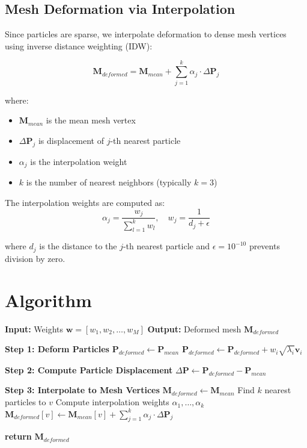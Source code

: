 \documentclass[12pt,a4paper]{article}
\begin{document}
\subsection{Mesh Deformation via Interpolation}

Since particles are sparse, we interpolate deformation to dense mesh vertices using inverse distance weighting (IDW):

\begin{equation}
\mathbf{M}_{deformed} = \mathbf{M}_{mean} + \sum_{j=1}^{k} \alpha_j \cdot \Delta \mathbf{P}_j
\end{equation}

where:
\begin{itemize}
    \item $\mathbf{M}_{mean}$ is the mean mesh vertex
    \item $\Delta \mathbf{P}_j$ is displacement of $j$-th nearest particle
    \item $\alpha_j$ is the interpolation weight
    \item $k$ is the number of nearest neighbors (typically $k=3$)
\end{itemize}

The interpolation weights are computed as:
\begin{equation}
\alpha_j = \frac{w_j}{\sum_{l=1}^{k} w_l}, \quad w_j = \frac{1}{d_j + \epsilon}
\end{equation}

where $d_j$ is the distance to the $j$-th nearest particle and $\epsilon = 10^{-10}$ prevents division by zero.

\section{Algorithm}

\begin{algorithm}
\caption{SSM Shape Reconstruction}
\begin{algorithmic}[1]
\State \textbf{Input:} Weights $\mathbf{w} = [w_1, w_2, \ldots, w_M]$
\State \textbf{Output:} Deformed mesh $\mathbf{M}_{deformed}$

\State \textbf{Step 1: Deform Particles}
\State $\mathbf{P}_{deformed} \gets \mathbf{P}_{mean}$
    \State $\mathbf{P}_{deformed} \gets \mathbf{P}_{deformed} + w_i \sqrt{\lambda_i} \mathbf{v}_i$
\EndFor

\State \textbf{Step 2: Compute Particle Displacement}
\State $\Delta \mathbf{P} \gets \mathbf{P}_{deformed} - \mathbf{P}_{mean}$

\State \textbf{Step 3: Interpolate to Mesh Vertices}
\State $\mathbf{M}_{deformed} \gets \mathbf{M}_{mean}$
    \State Find $k$ nearest particles to $v$
    \State Compute interpolation weights $\alpha_1, \ldots, \alpha_k$
    \State $\mathbf{M}_{deformed}[v] \gets \mathbf{M}_{mean}[v] + \sum_{j=1}^{k} \alpha_j \cdot \Delta \mathbf{P}_j$
\EndFor

\State \textbf{return} $\mathbf{M}_{deformed}$
\end{algorithmic}
\end{algorithm}
\end{document}
